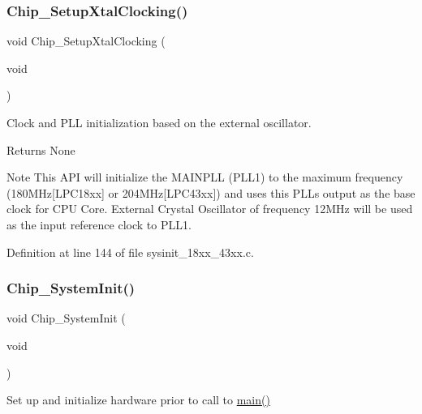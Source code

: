 \subsubsection{\texorpdfstring{Chip\+\_\+\+Setup\+Xtal\+Clocking()}{Chip\_SetupXtalClocking()}}
{\footnotesize\ttfamily void Chip\+\_\+\+Setup\+Xtal\+Clocking (\begin{DoxyParamCaption}\item[{void}]{ }\end{DoxyParamCaption})}



Clock and P\+LL initialization based on the external oscillator. 

\begin{DoxyReturn}{Returns}
None 
\end{DoxyReturn}
\begin{DoxyNote}{Note}
This A\+PI will initialize the M\+A\+I\+N\+P\+LL (P\+L\+L1) to the maximum frequency (180\+M\+Hz\mbox{[}L\+P\+C18xx\mbox{]} or 204\+M\+Hz\mbox{[}L\+P\+C43xx\mbox{]}) and uses this P\+LL\textquotesingle{}s output as the base clock for C\+PU Core. External Crystal Oscillator of frequency 12\+M\+Hz will be used as the input reference clock to P\+L\+L1. 
\end{DoxyNote}


Definition at line 144 of file sysinit\+\_\+18xx\+\_\+43xx.\+c.

\mbox{\label{group___s_u_p_p_o_r_t__18_x_x__43_x_x___f_u_n_c_ga3450fa020f6b569cc2deb69c11e11b7c}} 
\subsubsection{\texorpdfstring{Chip\+\_\+\+System\+Init()}{Chip\_SystemInit()}}
{\footnotesize\ttfamily void Chip\+\_\+\+System\+Init (\begin{DoxyParamCaption}\item[{void}]{ }\end{DoxyParamCaption})}



Set up and initialize hardware prior to call to \hyperlink{group__samples_ga840291bc02cba5474a4cb46a9b9566fe}{main()} 


